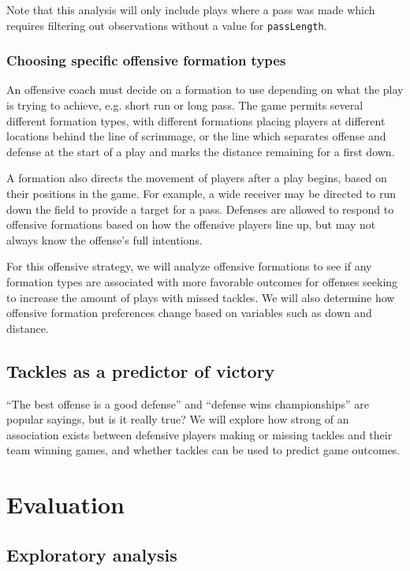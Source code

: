 \documentclass[bibtex, sigconf, hyperref={colorlinks=true,linkcolor=blue,urlcolor=blue}]{acmart}
\begin{document}
Note that this analysis will only include plays where a pass was made which
requires filtering out observations without a value for \texttt{passLength}.

\subsubsection{Choosing specific offensive formation types}

An offensive coach must decide on a formation to use depending on what the play
is trying to achieve, e.g. short run or long pass. The game permits several
different formation types, with different formations placing players at
different locations behind the line of scrimmage, or the line which separates
offense and defense at the start of a play and marks the distance remaining for
a first down.

A formation also directs the movement of players after a play begins, based on
their positions in the game. For example, a wide receiver may be directed to run
down the field to provide a target for a pass. Defenses are allowed to respond
to offensive formations based on how the offensive players line up, but may not
always know the offense's full intentions.

For this offensive strategy, we will analyze offensive formations to see if any
formation types are associated with more favorable outcomes for offenses seeking
to increase the amount of plays with missed tackles. We will also determine how
offensive formation preferences change based on variables such as down and
distance.

\subsection{Tackles as a predictor of victory}

“The best offense is a good defense” and “defense wins championships” are
popular sayings, but is it really true? We will explore how strong of an
association exists between defensive players making or missing tackles and
their team winning games, and whether tackles can be used to predict game
outcomes.

\section{Evaluation}

\subsection{Exploratory analysis}
\end{document}
